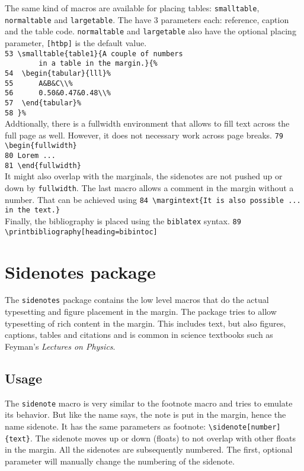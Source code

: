 \documentclass[]{caesar_book}
\begin{document}
The same kind of macros are available for placing tables: \texttt{smalltable}, \texttt{normaltable} and \texttt{largetable}. The have 3 parameters each: reference, caption and the table code. \texttt{normaltable} and \texttt{largetable} also have the optional placing parameter, \texttt{[htbp]} is the default value.\\
\verb+53 \smalltable{table1}{A couple of numbers+\\
\verb+        in a table in the margin.}{%+\\
\verb+54  \begin{tabular}{lll}%+\\
\verb+55      A&B&C\\%+\\
\verb+56      0.50&0.47&0.48\\%+\\
\verb+57  \end{tabular}%+\\
\verb+58 }%+\\
Addtionally, there is a fullwidth environment that allows to fill text across the full page as well. However, it does not necessary work across page breaks.
\verb+79 \begin{fullwidth}+\\
\verb+80 Lorem ...+\\
\verb+81 \end{fullwidth}+\\
It might also overlap with the marginals, the sidenotes are not pushed up or down by \texttt{fullwidth}. 
The last macro allows a comment in the margin without a number. That can be achieved using
\verb+84 \margintext{It is also possible ... in the text.}+\\
Finally, the bibliography is placed using the \texttt{biblatex} syntax.
\verb+89 \printbibliography[heading=bibintoc]+\\
%
\chapter{Sidenotes package}
%
The \texttt{sidenotes} package contains the low level macros that do the actual typesetting
and figure placement in the margin. The package tries to allow typesetting of rich content in the margin.
This includes text, but also figures, captions, tables and citations and is common in science textbooks such as Feyman's \textit{Lectures on Physics}.
%
\section{Usage}
%
The \texttt{sidenote} macro is very similar to
the footnote macro and tries to emulate its behavior. But like the name
says, the note is put in the margin, hence the name sidenote. It has the
same parameters as footnote:
\verb+\sidenote[number]{text}+. The sidenote moves up or down (floats)
to not overlap with other floats in the margin. All the sidenotes are subsequently numbered. The
first, optional parameter will manually change the numbering of the sidenote.
\end{document}
